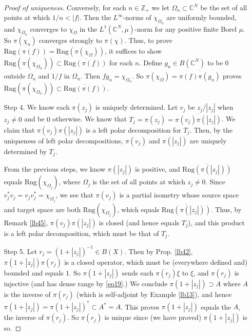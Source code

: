 \documentclass[12pt,a4paper,notitlepage]{article}
\theoremstyle{definition}
\theoremstyle{plain}
\newcommand{\ovl}{\overline}
\newcommand{\Cbb}{\mathbb C}
\newcommand{\Zbb}{\mathbb Z}
\newcommand{\Rng}{\mathrm{Rng}}
\numberwithin{equation}{section}
\begin{document}
\begin{proof}[Proof of uniqueness]
Conversely, for each $n\in\Zbb_+$ we let $\Omega_n\subset\Cbb^N$ be the set of all points at which $1/n<|f|$. Then the $L^\infty$-norms  of $\chi_{\Omega_n}$ are uniformly bounded, and $\chi_{\Omega_n}$ converges to $\chi_\Omega$ in the $L^1(\Cbb^N,\mu)$-norm for any positive finite Borel $\mu$. So $\pi(\chi_n)$ converges strongly to $\pi(\chi)$. Thus, to prove   $\ovl{\Rng(\pi(f))}=\Rng(\pi(\chi_\Omega))$, it suffices to show $\Rng(\pi(\chi_{\Omega_n}))\subset\ovl{\Rng(\pi(f))}$ for each $n$. Define $g_n\in B(\Cbb^N)$ to be $0$ outside $\Omega_n$ and $1/f$ in $\Omega_n$. Then $fg_n=\chi_{\Omega_n}$. So $\pi(\chi_{\Omega})=\ovl{\pi(f)\pi(g_n)}$ proves $\Rng(\pi(\chi_{\Omega_n}))\subset\ovl{\Rng(\pi(f))}$.
	
Step 4. We know each $\pi(z_j)$ is uniquely determined. Let $v_j$ be $z_j/|z_j|$ when $z_j\neq 0$ and be $0$ otherwise. We know that $T_j=\pi(z_j)=\ovl{\pi(v_j)\pi(|z_j|)}$. We claim that $\pi(v_j)\pi(|z_j|)$ is a left polar decomposition for $T_j$. Then, by the uniqueness of left polar decompositions, $\pi(v_j)$ and $\pi(|z_j|)$ are uniquely determined by $T_j$. 

From the previous steps, we know $\pi(|z_j|)$ is positive, and $\ovl{\Rng(\pi(|z_j|))}$ equals $\Rng(\chi_{\Omega_j})$, where $\Omega_j$ is the set of all points at which $z_j\neq 0$. Since $v_j^*v_j=v_jv_j^*=\chi_{\Omega_j}$, we see that $\pi(v_j)$ is a partial isometry whose source space and target space are both $\Rng(\chi_{\Omega_j})$, which equals $\ovl{\Rng(\pi(|z_j|))}$. Thus, by Remark \ref{lb45}, $\pi(v_j)\pi(|z_j|)$ is closed (and hence equals $T_j$), and this product is a left polar decomposition, which must be that of $T_j$.

Step 5. Let $r_j=(1+|z_j|)^{-1}\in B(X)$. Then by Prop. \ref{lb42},  $\pi(1+|z_j|)\pi(r_j)$ is a closed operator, which must be (everywhere defined and) bounded and equals $1$. So $\pi(1+|z_j|)$ sends each $\pi(r_j)\xi$ to $\xi$, and $\pi(r_j)$ is injective (and has dense range by \eqref{eq19}.) We conclude $\pi(1+|z_j|)\supset A$ where $A$ is the inverse of $\pi(r_j)$ (which is self-adjoint by Example \ref{lb13}), and hence $\pi(1+|z_j|)=\pi(1+|z_j|)^*\subset A^*=A$. This proves $\pi(1+|z_j|)$ equals the $A$, the inverse  of $\pi(r_j)$. So $\pi(r_j)$ is unique since (we have proved) $\pi(1+|z_j|)$ is so.




\end{proof}
\end{document}
